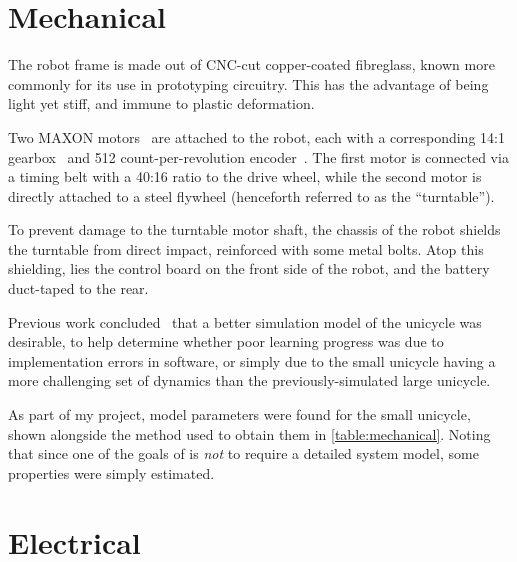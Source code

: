 \documentclass[main.tex]{subfiles}
\begin{document}
\section{Mechanical}

	The robot frame is made out of CNC-cut copper-coated fibreglass, known more commonly for its use in prototyping circuitry.
	This has the advantage of being light yet stiff, and immune to plastic deformation.

	Two MAXON motors~\cite{motor} are attached to the robot, each with a corresponding 14:1 gearbox~\cite{gearbox} and 512 count-per-revolution encoder~\cite{encoder}.
	The first motor is connected via a timing belt with a 40:16 ratio to the drive wheel, while the second motor is directly attached to a steel flywheel (henceforth referred to as the \enquote{turntable}).

	To prevent damage to the turntable motor shaft, the chassis of the robot shields the turntable from direct impact, reinforced with some metal bolts.
	Atop this shielding, lies the control board on the front side of the robot, and the battery duct-taped to the rear.

	Previous work concluded~\cite[p.~54]{aleksi} that a better simulation model of the unicycle was desirable, to help determine whether poor learning progress was due to implementation errors in software, or simply due to the small unicycle having a more challenging set of dynamics than the previously-simulated large unicycle.

	As part of my project, model parameters were found for the small unicycle, shown alongside the method used to obtain them in \cref{table:mechanical}.
	Noting that since one of the goals of {\Pilco} is \emph{not} to require a detailed system model, some properties were simply estimated.

	\begin{table}
		
		\label{table:mechanical}
	\end{table}


\section{Electrical}
\end{document}
